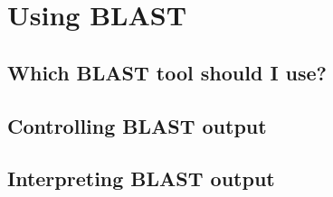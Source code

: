 \documentclass[table]{beamer}
\begin{document}
  \section{Using BLAST}
    \subsection{Which BLAST tool should I use?}
    \begin{frame}
     \frametitle{}
    \end{frame}

    \subsection{Controlling BLAST output}
    \begin{frame}
     \frametitle{}
    \end{frame}
     
    \subsection{Interpreting BLAST output}
    \begin{frame}
     \frametitle{}
    \end{frame}
    
\end{document}
